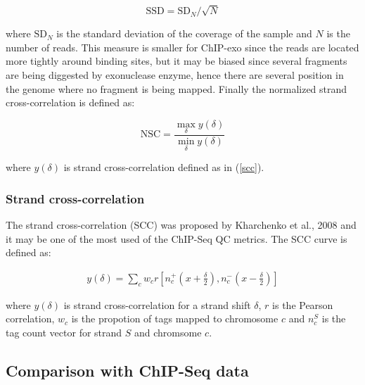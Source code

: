 \documentclass[11pt]{article}\usepackage[]{graphicx}\usepackage[]{color}
\begin{document}
\[
\mbox{SSD} = \mbox{SD}_N / \sqrt{N} 
\]

where $\mbox{SD}_N$ is the standard deviation of the coverage of the
sample and $N$ is the number of reads. This measure is smaller for
ChIP-exo since the reads are located more tightly around binding
sites, but it may be biased since several fragments are being
diggested by exonuclease enzyme, hence there are several position in
the genome where no fragment is being mapped. Finally the normalized
strand cross-correlation is defined as:

\[
\mbox{NSC} = \frac{ \max_\delta y(\delta)}{\min_\delta y(\delta)}
\]

where $y(\delta)$ is strand cross-correlation defined as in (\ref{scc}). 

\subsubsection{Strand cross-correlation}
\label{sec:scc}

The strand cross-correlation (SCC) was proposed by Kharchenko et al.,
2008 \cite{strandcc} and it may be one of the most used of the
ChIP-Seq QC metrics. The SCC curve is defined as:

\begin{align}
  y(\delta) = \sum_c w_c r\left[ n_c^+ \left(x + \frac{\delta}{2}
    \right), n_c^- \left( x- \frac{\delta}{2} \right)\right]
\label{scc}
\end{align}

where $y(\delta)$ is strand cross-correlation for a strand shift
$\delta$, $r$ is the Pearson correlation, $w_c$ is the propotion of
tags mapped to chromosome $c$ and $n_c^S$ is the tag count vector for
strand $S$ and chromsome $c$.





\subsection{Comparison with ChIP-Seq data}
\label{sec:comp_chipseq}
\end{document}
